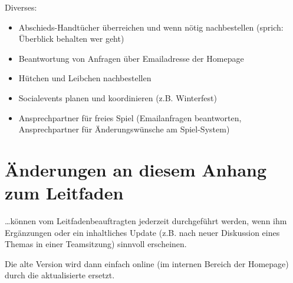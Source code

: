 \documentclass[a4 paper, 11pt]{article}
\begin{document}
\vspace{0.3cm}
Diverses:
\begin{itemize}
	\item Abschieds-Handtücher überreichen und wenn nötig nachbestellen (sprich: Überblick
	behalten wer geht)
	\item Beantwortung von Anfragen über Emailadresse der Homepage
	\item Hütchen und Leibchen nachbestellen
	\item Socialevents planen und koordinieren (z.B. Winterfest)
	\item Ansprechpartner für freies Spiel (Emailanfragen beantworten, Ansprechpartner
	für Änderungswünsche am Spiel-System)
\end{itemize}


\section{Änderungen an diesem Anhang zum Leitfaden}
\dots können vom Leitfadenbeauftragten jederzeit durchgeführt werden, wenn ihm Ergänzungen oder ein inhaltliches Update (z.B. nach neuer Diskussion eines Themas in einer Teamsitzung) sinnvoll erscheinen.

Die alte Version wird dann einfach online (im internen Bereich der Homepage) durch die aktualisierte ersetzt.
\end{document}
